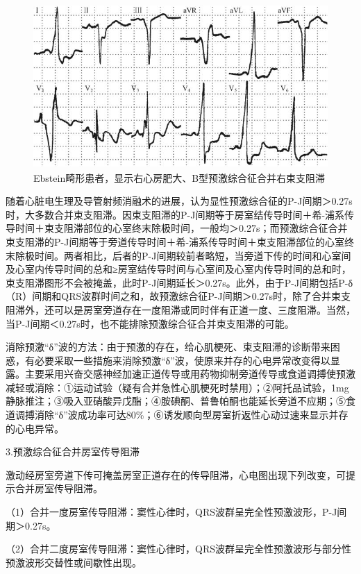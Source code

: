 \begin{figure}[!htbp]
 \centering
 \includegraphics[width=4.5in,height=2.45833in]{./images/Image00590.jpg}
 \captionsetup{justification=centering}
 \caption{Ebstein畸形患者，显示右心房肥大、B型预激综合征合并右束支阻滞}
 \label{fig36-18}
  \end{figure} 

随着心脏电生理及导管射频消融术的进展，认为显性预激综合征的P-J间期＞0.27s时，大多数合并束支阻滞。因束支阻滞的P-J间期等于房室结传导时间＋希-浦系传导时间＋束支阻滞部位的心室终末除极时间，一般均＞0.27s；而预激综合征合并束支阻滞的P-J间期等于旁道传导时间＋希-浦系传导时间＋束支阻滞部位的心室终末除极时间。两者相比，后者的P-J间期较前者略短，当旁道下传的时间和心室间及心室内传导时间的总和≥房室结传导时间与心室间及心室内传导时间的总和时，束支阻滞图形不会被掩盖，此时P-J间期延长＞0.27s。此外，由于P-J间期包括P-δ（R）间期和QRS波群时间之和，故预激综合征P-J间期＞0.27s时，除了合并束支阻滞外，还可以是房室旁道存在一度阻滞或同时伴有正道一度、三度阻滞。当然，当P-J间期＜0.27s时，也不能排除预激综合征合并束支阻滞的可能。

消除预激“δ”波的方法：由于预激的存在，给心肌梗死、束支阻滞的诊断带来困惑，有必要采取一些措施来消除预激“δ”波，使原来并存的心电异常改变得以显露。主要采用兴奋交感神经加速正道传导或用药物抑制旁道传导或食道调搏使预激减轻或消除：①运动试验（疑有合并急性心肌梗死时禁用）；②阿托品试验，1mg静脉推注；③吸入亚硝酸异戊酯；④胺碘酮、普鲁帕酮也能延长旁道不应期；⑤食道调搏消除“δ”波成功率可达80\%；⑥诱发顺向型房室折返性心动过速来显示并存的心电异常。

3.预激综合征合并房室传导阻滞

激动经房室旁道下传可掩盖房室正道存在的传导阻滞，心电图出现下列改变，可提示合并房室传导阻滞。

（1）合并一度房室传导阻滞：窦性心律时，QRS波群呈完全性预激波形，P-J间期＞0.27s。

（2）合并二度房室传导阻滞：窦性心律时，QRS波群呈完全性预激波形与部分性预激波形交替性或间歇性出现。

